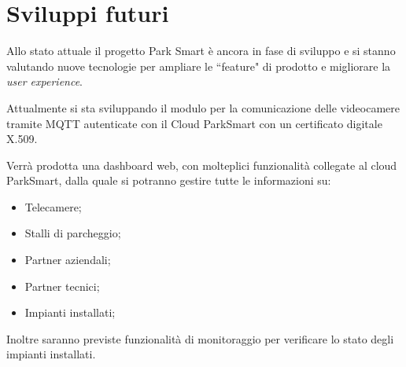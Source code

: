 \chapter{Sviluppi futuri}

Allo stato attuale il progetto Park Smart è ancora in fase di sviluppo e si stanno valutando nuove tecnologie per ampliare le ``feature" di prodotto e migliorare la \textit{user experience}. 

Attualmente si sta sviluppando il modulo per la comunicazione delle videocamere tramite MQTT autenticate con il Cloud ParkSmart con un certificato digitale X.509.
\newline

Verrà prodotta una dashboard web, con molteplici funzionalità collegate al cloud ParkSmart, dalla quale si potranno gestire tutte le informazioni su:
\begin{itemize}
	\item Telecamere;
	\item Stalli di parcheggio;
	\item Partner aziendali;
	\item Partner tecnici;
	\item Impianti installati;
\end{itemize}


Inoltre saranno previste funzionalità di monitoraggio per verificare lo stato degli impianti installati.

